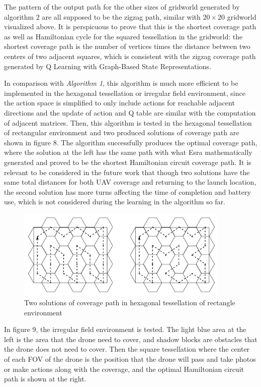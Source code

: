 \documentclass{article}
\begin{document}
The pattern of the output path for the other sizes of gridworld generated by algorithm 2 are all supposed to be the zigzag path, similar with $20\times20$ gridworld visualized above. It is perspicuous to prove that this is the shortest coverage path as well as Hamiltonian cycle for the squared tessellation in the gridworld: the shortest coverage path is the number of vertices times the distance between two centers of two adjacent squares, which is consistent with the zigzag coverage path generated by Q Learning with Graph-Based State Representations.

In comparison with \textit{Algorithm 1}, this algorithm is much more efficient to be implemented in the hexagonal tessellation or irregular field environment, since the action space is simplified to only include actions for reachable adjacent directions and the update of action and Q table are similar with the computation of adjacent matrices. Then, this algorithm is tested in the hexagonal tessellation of rectangular environment and two produced solutions of coverage path are shown in figure 8. The algorithm successfully produces the optimal coverage path, where the solution at the left has the same path with what Esra mathematically generated and proved to be the shortest Hamiltonian circuit coverage path\cite{esra}. It is relevant to be considered in the future work that though two solutions have the same total distances for both UAV coverage and returning to the launch location, the second solution has more turns affecting the time of completion and battery use, which is not considered during the learning in the algorithm so far.  

\begin{figure}[H]
     \centering
     \includegraphics[width=4in]{11.png}
     \caption{Two solutions of coverage path in hexagonal tessellation of rectangle environment}
\end{figure}

In figure 9, the irregular field environment is tested. The light blue area at the left is the area that the drone need to cover, and shadow blocks are obstacles that the drone does not need to cover. Then the square tessellation where the center of each FOV of the drone is the position that the drone will pass and take photos or make actions along with the coverage, and the optimal Hamiltonian circuit path is shown at the right.
\end{document}
